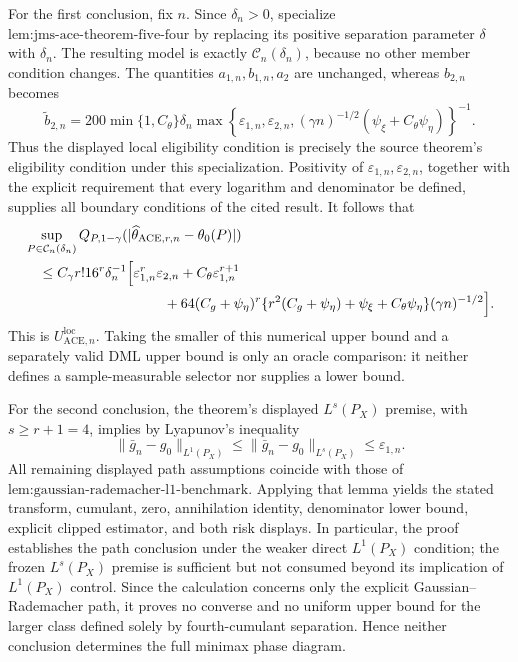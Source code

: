 For the first conclusion, fix \(n\).  Since \(\delta_n>0\), specialize \(\text{lem:jms-ace-theorem-five-four}\) by replacing its positive separation parameter \(\delta\) with \(\delta_n\).  The resulting model is exactly \(\mathcal C_n(\delta_n)\), because no other member condition changes.  The quantities \(a_{1,n},b_{1,n},a_2\) are unchanged, whereas \(b_{2,n}\) becomes
\[
 \widetilde b_{2,n}
 =200\min\{1,C_{\theta}\}\delta_n
 \max\!\left\{\varepsilon_{1,n},\varepsilon_{2,n},
 (\gamma n)^{-1/2}(\psi_{\xi}+C_{\theta}\psi_{\eta})\right\}^{-1}.
\]
Thus the displayed local eligibility condition is precisely the source theorem's eligibility condition under this specialization.  Positivity of \(\varepsilon_{1,n},\varepsilon_{2,n}\), together with the explicit requirement that every logarithm and denominator be defined, supplies all boundary conditions of the cited result.  It follows that
\[
\begin{aligned}
 &\sup_{P\in\mathcal C_n(\delta_n)}
 Q_{P,1-\gamma}(|\widehat\theta_{\mathrm{ACE},r,n}-\theta_0(P)|)\\
 &\quad\le C_{\gamma}r!16^r\delta_n^{-1}
 \Bigl[\varepsilon_{1,n}^r\varepsilon_{2,n}
 +C_{\theta}\varepsilon_{1,n}^{r+1}\\
 &\hspace{35mm}
 +64(C_g+\psi_{\eta})^r
 \{r^2(C_g+\psi_{\eta})+\psi_{\xi}+C_{\theta}\psi_{\eta}\}
 (\gamma n)^{-1/2}\Bigr].
\end{aligned}
\]
This is \(U_{\mathrm{ACE},n}^{\mathrm{loc}}\).  Taking the smaller of this numerical upper bound and a separately valid DML upper bound is only an oracle comparison: it neither defines a sample-measurable selector nor supplies a lower bound.

For the second conclusion, the theorem's displayed \(L^s(P_X)\) premise, with \(s\ge r+1=4\), implies by Lyapunov's inequality
\[
 \|\bar g_n-g_0\|_{L^1(P_X)}
 \le\|\bar g_n-g_0\|_{L^s(P_X)}
 \le\varepsilon_{1,n}.
\]
All remaining displayed path assumptions coincide with those of \(\text{lem:gaussian-rademacher-l1-benchmark}\).  Applying that lemma yields the stated transform, cumulant, zero, annihilation identity, denominator lower bound, explicit clipped estimator, and both risk displays.  In particular, the proof establishes the path conclusion under the weaker direct \(L^1(P_X)\) condition; the frozen \(L^s(P_X)\) premise is sufficient but not consumed beyond its implication of \(L^1(P_X)\) control.  Since the calculation concerns only the explicit Gaussian--Rademacher path, it proves no converse and no uniform upper bound for the larger class defined solely by fourth-cumulant separation.  Hence neither conclusion determines the full minimax phase diagram.